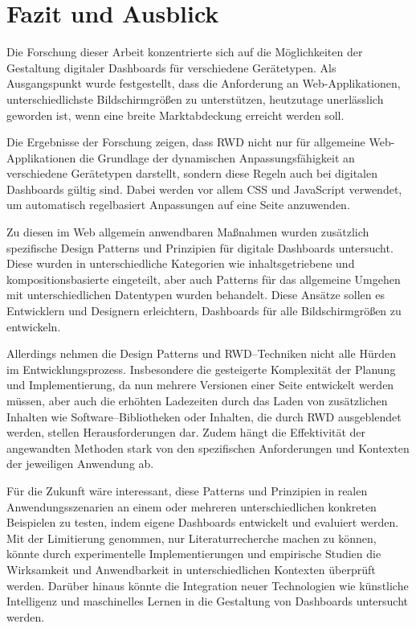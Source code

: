 \section{Fazit und Ausblick}\label{sec:fazit-ausblick}

Die Forschung dieser Arbeit konzentrierte sich auf die Möglichkeiten der Gestaltung digitaler Dashboards für verschiedene Gerätetypen.
Als Ausgangspunkt wurde festgestellt, dass die Anforderung an Web-Applikationen, unterschiedlichste Bildschirmgrößen zu unterstützen, heutzutage unerlässlich geworden ist, wenn eine breite Marktabdeckung erreicht werden soll.

Die Ergebnisse der Forschung zeigen, dass \ac{RWD} nicht nur für allgemeine Web-Applikationen die Grundlage der dynamischen Anpassungsfähigkeit an verschiedene Gerätetypen darstellt, sondern diese Regeln auch bei digitalen Dashboards gültig sind.
Dabei werden vor allem \ac{CSS} und JavaScript verwendet, um automatisch regelbasiert Anpassungen auf eine Seite anzuwenden.

Zu diesen im Web allgemein anwendbaren Maßnahmen wurden zusätzlich spezifische Design Patterns und Prinzipien für digitale Dashboards untersucht.
Diese wurden in unterschiedliche Kategorien wie inhaltsgetriebene und kompositionsbasierte eingeteilt, aber auch Patterns für das allgemeine Umgehen mit unterschiedlichen Datentypen wurden behandelt.
Diese Ansätze sollen es Entwicklern und Designern erleichtern, Dashboards für alle Bildschirmgrößen zu entwickeln.

Allerdings nehmen die Design Patterns und \ac{RWD}--Techniken nicht alle Hürden im Entwicklungsprozess.
Insbesondere die gesteigerte Komplexität der Planung und Implementierung, da nun mehrere Versionen einer Seite entwickelt werden müssen, aber auch die erhöhten Ladezeiten durch das Laden von zusätzlichen Inhalten wie Software--Bibliotheken oder Inhalten, die durch \ac{RWD} ausgeblendet werden, stellen Herausforderungen dar.
Zudem hängt die Effektivität der angewandten Methoden stark von den spezifischen Anforderungen und Kontexten der jeweiligen Anwendung ab.

Für die Zukunft wäre interessant, diese Patterns und Prinzipien in realen Anwendungsszenarien an einem oder mehreren unterschiedlichen konkreten Beispielen zu testen, indem eigene Dashboards entwickelt und evaluiert werden.
Mit der Limitierung genommen, nur Literaturrecherche machen zu können, könnte durch experimentelle Implementierungen und empirische Studien die Wirksamkeit und Anwendbarkeit in unterschiedlichen Kontexten überprüft werden.
Darüber hinaus könnte die Integration neuer Technologien wie künstliche Intelligenz und maschinelles Lernen in die Gestaltung von Dashboards untersucht werden.


